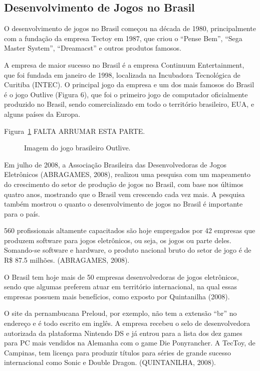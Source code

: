 \subsection{Desenvolvimento de Jogos no Brasil}

O desenvolvimento de jogos no Brasil começou na década de 1980, principalmente com a fundação da empresa Tectoy em 1987, que criou o “Pense Bem”, “Sega Master System”, “Dreamacst” e outros produtos famosos. 

A empresa de maior sucesso no Brasil é a empresa Continuum Entertainment, que foi fundada em janeiro de 1998, localizada na Incubadora Tecnológica de Curitiba (INTEC). O principal jogo da empresa e um dos mais famosos do Brasil é o jogo Outlive (Figura 6), que foi o primeiro jogo de computador oficialmente produzido no Brasil, sendo comercializado em todo o território brasileiro, EUA, e alguns países da Europa.

Figura~\ref{f1.7} FALTA ARRUMAR ESTA PARTE.
\begin{figure}[!hbp]
\makebox[\textwidth]{\framebox[5cm]{\rule{0pt}{5cm}}}
\caption{Imagem do jogo brasileiro Outlive.} \label{f1.7}
\end{figure}

Em julho de 2008, a Associação Brasileira das Desenvolvedoras de Jogos Eletrônicos (ABRAGAMES, 2008), realizou uma pesquisa com um mapeamento do crescimento do setor de produção de jogos no Brasil, com base nos últimos quatro anos, mostrando que o Brasil vem crescendo cada vez mais. A pesquisa também mostrou o quanto o desenvolvimento de jogos no Brasil é importante para o país.

\begin{citacao}
560 profissionais altamente capacitados são hoje empregados por 42 empresas que produzem software para jogos eletrônicos, ou seja, os jogos ou parte deles. Somando-se software e hardware, o produto nacional bruto do setor de jogo é de R\$ 87.5 milhões. (ABRAGAMES, 2008).
\end{citacao}

O Brasil tem hoje mais de 50 empresas desenvolvedoras de jogos eletrônicos, sendo que algumas preferem atuar em território internacional, na qual essas empresas possuem mais benefícios, como exposto por Quintanilha (2008).

\begin{citacao}
O site da pernambucana Preloud, por exemplo, não tem a extensão “br” no endereço e é todo escrito em inglês. A empresa recebeu o selo de desenvolvedora autorizada da plataforma Nintendo DS e já entrou para a lista dos dez games para PC mais vendidos na Alemanha com o game Die Ponyrancher. A TecToy, de Campinas, tem licença para produzir títulos para séries de grande sucesso internacional como Sonic e Double Dragon. (QUINTANILHA, 2008).
\end{citacao}

